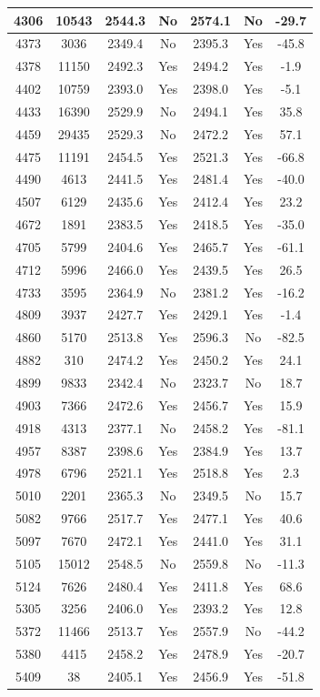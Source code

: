 \begin{center}
\begin{longtable}{|c|c|c|c|c|c|c|}
\hline 4306 & 10543 & 2544.3 & No & 2574.1 & No & -29.7 \\
\hline 4373 & 3036 & 2349.4 & No & 2395.3 & Yes & -45.8 \\
\hline 4378 & 11150 & 2492.3 & Yes & 2494.2 & Yes & -1.9 \\
\hline 4402 & 10759 & 2393.0 & Yes & 2398.0 & Yes & -5.1 \\
\hline 4433 & 16390 & 2529.9 & No & 2494.1 & Yes & 35.8 \\
\hline 4459 & 29435 & 2529.3 & No & 2472.2 & Yes & 57.1 \\
\hline 4475 & 11191 & 2454.5 & Yes & 2521.3 & Yes & -66.8 \\
\hline 4490 & 4613 & 2441.5 & Yes & 2481.4 & Yes & -40.0 \\
\hline 4507 & 6129 & 2435.6 & Yes & 2412.4 & Yes & 23.2 \\
\hline 4672 & 1891 & 2383.5 & Yes & 2418.5 & Yes & -35.0 \\
\hline 4705 & 5799 & 2404.6 & Yes & 2465.7 & Yes & -61.1 \\
\hline 4712 & 5996 & 2466.0 & Yes & 2439.5 & Yes & 26.5 \\
\hline 4733 & 3595 & 2364.9 & No & 2381.2 & Yes & -16.2 \\
\hline 4809 & 3937 & 2427.7 & Yes & 2429.1 & Yes & -1.4 \\
\hline 4860 & 5170 & 2513.8 & Yes & 2596.3 & No & -82.5 \\
\hline 4882 & 310 & 2474.2 & Yes & 2450.2 & Yes & 24.1 \\
\hline 4899 & 9833 & 2342.4 & No & 2323.7 & No & 18.7 \\
\hline 4903 & 7366 & 2472.6 & Yes & 2456.7 & Yes & 15.9 \\
\hline 4918 & 4313 & 2377.1 & No & 2458.2 & Yes & -81.1 \\
\hline 4957 & 8387 & 2398.6 & Yes & 2384.9 & Yes & 13.7 \\
\hline 4978 & 6796 & 2521.1 & Yes & 2518.8 & Yes & 2.3 \\
\hline 5010 & 2201 & 2365.3 & No & 2349.5 & No & 15.7 \\
\hline 5082 & 9766 & 2517.7 & Yes & 2477.1 & Yes & 40.6 \\
\hline 5097 & 7670 & 2472.1 & Yes & 2441.0 & Yes & 31.1 \\
\hline 5105 & 15012 & 2548.5 & No & 2559.8 & No & -11.3 \\
\hline 5124 & 7626 & 2480.4 & Yes & 2411.8 & Yes & 68.6 \\
\hline 5305 & 3256 & 2406.0 & Yes & 2393.2 & Yes & 12.8 \\
\hline 5372 & 11466 & 2513.7 & Yes & 2557.9 & No & -44.2 \\
\hline 5380 & 4415 & 2458.2 & Yes & 2478.9 & Yes & -20.7 \\
\hline 5409 & 38 & 2405.1 & Yes & 2456.9 & Yes & -51.8 \\
\end{longtable}
\end{center}

